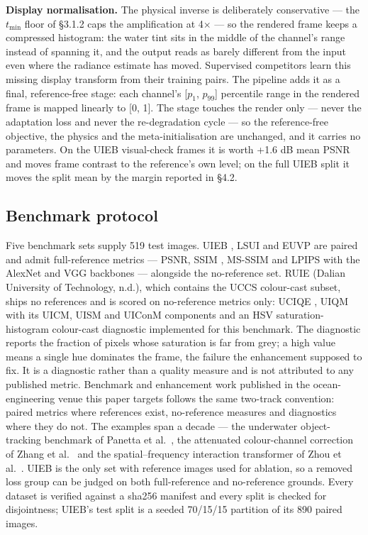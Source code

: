 \documentclass[journal]{IEEEtran}
\begin{document}
\textbf{Display normalisation.} The physical inverse is deliberately conservative --- the $t_{\min}$ floor of \S{}3.1.2 caps the amplification at 4$\times$ --- so the rendered frame keeps a compressed histogram: the water tint sits in the middle of the channel's range instead of spanning it, and the output reads as barely different from the input even where the radiance estimate has moved. Supervised competitors learn this missing display transform from their training pairs. The pipeline adds it as a final, reference-free stage: each channel's [$p_{1}$, $p_{99}$] percentile range in the rendered frame is mapped linearly to [0, 1]. The stage touches the render only --- never the adaptation loss and never the re-degradation cycle --- so the reference-free objective, the physics and the meta-initialisation are unchanged, and it carries no parameters. On the UIEB visual-check frames it is worth +1.6 dB mean PSNR and moves frame contrast to the reference's own level; on the full UIEB split it moves the split mean by the margin reported in \S{}4.2.

\subsection{Benchmark protocol}
Five benchmark sets supply 519 test images. UIEB \cite{li2020uieb}, LSUI \cite{peng2023ushape} and EUVP \cite{islam2020funie} are paired and admit full-reference metrics --- PSNR, SSIM \cite{wang2004ssim}, MS-SSIM \cite{wang2003msssim} and LPIPS with the AlexNet and VGG backbones \cite{zhang2018lpips} --- alongside the no-reference set. RUIE (Dalian University of Technology, n.d.), which contains the UCCS colour-cast subset, ships no references and is scored on no-reference metrics only: UCIQE \cite{yang2015uciqe}, UIQM with its UICM, UISM and UIConM components \cite{panetta2016uiqm} and an HSV saturation-histogram colour-cast diagnostic implemented for this benchmark. The diagnostic reports the fraction of pixels whose saturation is far from grey; a high value means a single hue dominates the frame, the failure the enhancement supposed to fix. It is a diagnostic rather than a quality measure and is not attributed to any published metric. Benchmark and enhancement work published in the ocean-engineering venue this paper targets follows the same two-track convention: paired metrics where references exist, no-reference measures and diagnostics where they do not. The examples span a decade --- the underwater object-tracking benchmark of Panetta et al.~\cite{panetta2022uwtbench}, the attenuated colour-channel correction of Zhang et al.~\cite{zhang2022attenuated} and the spatial--frequency interaction transformer of Zhou et al.~\cite{zhou2025sfiformer}. UIEB is the only set with reference images used for ablation, so a removed loss group can be judged on both full-reference and no-reference grounds. Every dataset is verified against a sha256 manifest and every split is checked for disjointness; UIEB's test split is a seeded 70/15/15 partition of its 890 paired images.
\end{document}
